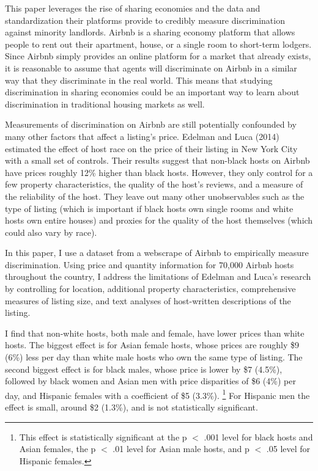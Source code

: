 This paper leverages the rise of sharing economies and the data and standardization their platforms provide to credibly measure discrimination against minority landlords. Airbnb is a sharing economy platform that allows people to rent out their apartment, house, or a single room to short-term lodgers. Since Airbnb simply provides an online platform for a market that already exists, it is reasonable to assume that agents will discriminate on Airbnb in a similar way that they discriminate in the real world. This means that studying discrimination in sharing economies could be an important way to learn about discrimination in traditional housing markets as well.

Measurements of discrimination on Airbnb are still potentially confounded by many other factors that affect a listing's price. Edelman and Luca (2014) estimated the effect of host race on the price of their listing in New York City with a small set of controls. Their results suggest that non-black hosts on Airbnb have prices roughly 12\% higher than black hosts. However, they only control for a few property characteristics, the quality of the host's reviews, and a measure of the reliability of the host. They leave out many other unobservables such as the type of listing (which is important if black hosts own single rooms and white hosts own entire houses) and proxies for the quality of the host themselves (which could also vary by race). 

In this paper, I use a dataset from a webscrape of Airbnb to empirically measure discrimination. Using price and quantity information for 70,000 Airbnb hosts throughout the country, I address the limitations of Edelman and Luca's research by controlling for location, additional property characteristics, comprehensive measures of listing size, and text analyses of host-written descriptions of the listing. 

I find that non-white hosts, both male and female, have lower prices than white hosts. The biggest effect is for Asian female hosts, whose prices are roughly \$9 (6\%) less per day than white male hosts who own the same type of listing. The second biggest effect is for black males, whose price is lower by \$7 (4.5\%), followed by black women and Asian men with price disparities of \$6 (4\%) per day, and Hispanic females with a coefficient of \$5 (3.3\%).%
\footnote{This effect is statistically significant at the p $<$ .001 level for black hosts and Asian females, the p $<$ .01 level for Asian male hosts, and p $<$ .05 level for Hispanic females.} 
For Hispanic men the effect is small, around \$2 (1.3\%), and is not statistically significant. 

